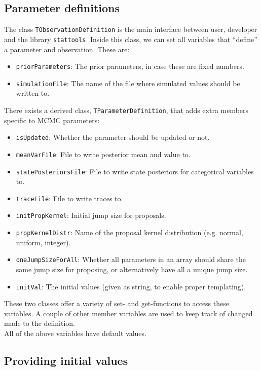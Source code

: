 \documentclass[a4paper,11pt]{article}
\def\stattools{\texttt{stattools}}
\newcommand{\class}[1]{\texttt{#1}}
\newcommand{\privparam}[1]{\texttt{\textunderscore #1}}
\begin{document}
\subsection{Parameter definitions}
The class \class{TObservationDefinition} is the main interface between user, developer and the library \stattools{}. Inside this class, we can set all variables that ``define'' a parameter and observation. These are:
\begin{itemize}
 \item \privparam{priorParameters}: The prior parameters, in case these are fixed numbers.
 \item \privparam{simulationFile}: The name of the file where simulated values should be written to.
\end{itemize}
There exists a derived class, \class{TParameterDefinition}, that adds extra members specific to MCMC parameters:
\begin{itemize}
 \item \privparam{isUpdated}: Whether the parameter should be updated or not.
 \item \privparam{meanVarFile}: File to write posterior mean and value to.
  \item \privparam{statePosteriorsFile}: File to write state posteriors for categorical variables to.
 \item \privparam{traceFile}: File to write traces to.
 \item \privparam{initPropKernel}: Initial jump size for proposals.
 \item \privparam{propKernelDistr}: Name of the proposal kernel distribution (e.g. normal, uniform, integer).
 \item \privparam{oneJumpSizeForAll}: Whether all parameters in an array should share the same jump size for proposing, or alternatively have all a unique jump size.
 \item \privparam{initVal}: The initial values (given as string, to enable proper templating).
\end{itemize}
These two classes offer a variety of set- and get-functions to access these variables. A couple of other member variables are used to keep track of changed made to the definition.  \\
All of the above variables have default values.

\subsection{Providing initial values}
\end{document}
